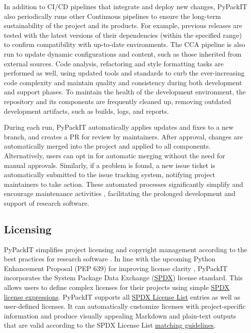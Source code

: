 \documentclass{article}
\begin{document}
In addition to CI/CD pipelines that integrate and deploy new changes, PyPackIT also periodically runs other Continuous pipelines to ensure the long-term sustainability of the project and its products. For example, previous releases are tested with the latest versions of their dependencies (within the specified range) to confirm compatibility with up-to-date environments. The CCA pipeline is also run to update dynamic configurations and content, such as those inherited from external sources. Code analysis, refactoring and style formatting tasks are performed as well, using updated tools and standards to curb the ever-increasing code complexity and maintain quality and consistency during both development and support phases. To maintain the health of the development environment, the repository and its components are frequently cleaned up, removing outdated development artifacts, such as builds, logs, and reports.

During each run, PyPackIT automatically applies updates and fixes to a new branch, and creates a PR for review by maintainers. After approval, changes are automatically merged into the project and applied to all components. Alternatively, users can opt in for automatic merging without the need for manual approvals. Similarly, if a problem is found, a new issue ticket is automatically submitted to the issue tracking system, notifying project maintainers to take action. These automated processes significantly simplify and encourage maintenance activities \cite{CanAutoPRsEncourageDepUpgrade}, facilitating the prolonged development and support of research software.

\subsection{Licensing}

PyPackIT simplifies project licensing and copyright management according to the best practices for research software \cite{QuickGuideToLicensing, BarelySufficientPracticesInSciComp, SustainableResearchSoftwareHandOver, ShiningLight, 10RuleForSoftwareInCompBio}. In line with the upcoming Python Enhancement Proposal (PEP 639) for improving license clarity \cite{PEP639}, PyPackIT incorporates the System Package Data Exchange (\href{https://spdx.org/}{SPDX}) license standard. This allows users to define complex licenses for their projects using simple \href{https://spdx.github.io/spdx-spec/v3.0.1/annexes/spdx-license-expressions/}{SPDX license expressions}. PyPackIT supports all \href{https://spdx.org/licenses/}{SPDX License List} entries as well as user-defined licenses. It can automatically customize licenses with project-specific information and produce visually appealing Markdown and plain-text outputs that are valid according to the SPDX License List \href{https://spdx.github.io/spdx-spec/v3.0.1/annexes/license-matching-guidelines-and-templates/}{matching guidelines}.
\end{document}
